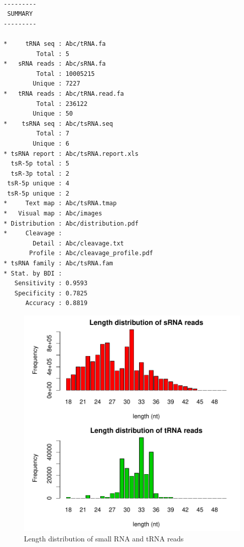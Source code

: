 \documentclass[11pt, a4paper]{article}
\begin{document}
{\footnotesize \begin{tcolorbox}[colback=blue!5!white,colframe=blue!75!black,title=tsRFinder demo output list]
\begin{verbatim}

---------
 SUMMARY 
---------

*     tRNA seq : Abc/tRNA.fa
         Total : 5
*   sRNA reads : Abc/sRNA.fa
         Total : 10005215
        Unique : 7227
*   tRNA reads : Abc/tRNA.read.fa
         Total : 236122
        Unique : 50
*    tsRNA seq : Abc/tsRNA.seq
         Total : 7
        Unique : 6
* tsRNA report : Abc/tsRNA.report.xls
  tsR-5p total : 5
  tsR-3p total : 2
 tsR-5p unique : 4
 tsR-5p unique : 2
*     Text map : Abc/tsRNA.tmap
*   Visual map : Abc/images
* Distribution : Abc/distribution.pdf
*     Cleavage :
        Detail : Abc/cleavage.txt
       Profile : Abc/cleavage_profile.pdf
* tsRNA family : Abc/tsRNA.fam
* Stat. by BDI :
   Sensitivity : 0.9593
   Specificity : 0.7825
      Accuracy : 0.8819

\end{verbatim}
\end{tcolorbox}}

\begin{figure}[htbp]
\begin{center}
\includegraphics[width=13cm]{distribution.pdf}
\caption{Length distribution of small RNA and tRNA reads}
\label{distribution}
\end{center}
\end{figure}
\end{document}
